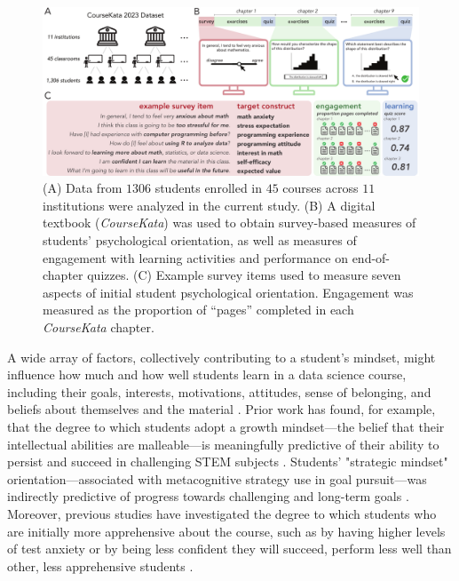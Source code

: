 \documentclass[10pt,letterpaper]{article}
\newcommand{\ck}{\textit{CourseKata}}
\begin{document}
\begin{figure}[htbp!]
\begin{center}
\includegraphics[width=0.95\linewidth]{figures_cogsci/ck_dataset_observation_methods_combined.pdf}
\end{center}
\caption{(A) Data from $1306$ students enrolled in $45$ courses across $11$ institutions were analyzed in the current study. 
(B) A digital textbook (\ck) was used to obtain survey-based measures of students' psychological orientation, as well as measures of engagement with learning activities and performance on end-of-chapter quizzes. 
(C) Example survey items used to measure seven aspects of initial student psychological orientation. Engagement was measured as the proportion of ``pages'' completed in each \ck{} chapter.} 
\label{fig:coursekata_content}
\end{figure}

A wide array of factors, collectively contributing to a student's mindset, might influence how much and how well students learn in a data science course, including their goals, interests, motivations, attitudes, sense of belonging, and beliefs about themselves and the material \cite{dweck2017needs, murphy2007signaling, duckworth2007grit, bandura2001self, walton2007question, onwuegbuzie2003statistics}.
Prior work has found, for example, that the degree to which students adopt a growth mindset---the belief that their intellectual abilities are malleable---is meaningfully predictive of their ability to persist and succeed in challenging STEM subjects \cite{yeager2019national, yeager2020can, yeager2022synergistic}. 
Students' "strategic mindset" orientation---associated with metacognitive strategy use in goal pursuit---was indirectly predictive of progress towards challenging and long-term goals \cite{Chen2020strategic}.
Moreover, previous studies have investigated the degree to which students who are initially more apprehensive about the course, such as by having higher levels of test anxiety or by being less confident they will succeed, perform less well than other, less apprehensive students \cite{sutter2024concerns, zeidner2007test, cassady2002cognitive}. 
\end{document}
